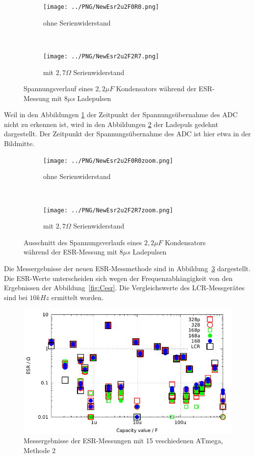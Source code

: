 \begin{figure}[H]
  \begin{subfigure}[b]{9cm}
    \centering
    \texttt{[image: ../PNG/NewEsr2u2F0R0.png]}
    \caption{ohne Serienwiderstand}
  \end{subfigure}
  ~
  \begin{subfigure}[b]{9cm}
    \centering
    \texttt{[image: ../PNG/NewEsr2u2F2R7.png]}
    \caption{mit \(2,7\Omega\) Serienwiderstand}
  \end{subfigure}
  \caption{Spannungsverlauf eines \(2,2\mu F\) Kondensators während der ESR-Messung mit \(8\mu s\) Ladepulsen}
  \label{pic:NewEsr2}
\end{figure}

Weil in den Abbildungen \ref{pic:NewEsr2} der Zeitpunkt der Spannungsübernahme des ADC nicht zu erkennen ist,
wird in den Abbildungen \ref{pic:NewEsr2zoom} der Ladepuls gedehnt dargestellt. Der Zeitpunkt der Spannungsübernahme
des ADC ist hier etwa in der Bildmitte.

\begin{figure}[H]
  \begin{subfigure}[b]{9cm}
    \centering
    \texttt{[image: ../PNG/NewEsr2u2F0R0zoom.png]}
    \caption{ohne Serienwiderstand}
  \end{subfigure}
  ~
  \begin{subfigure}[b]{9cm}
    \centering
    \texttt{[image: ../PNG/NewEsr2u2F2R7zoom.png]}
    \caption{mit \(2,7\Omega\) Serienwiderstand}
  \end{subfigure}
  \caption{Ausschnitt des Spannungsverlaufs eines \(2,2\mu F\) Kondensators während der ESR-Messung mit \(8\mu s\) Ladepulsen}
  \label{pic:NewEsr2zoom}
\end{figure}
 

Die Messergebnisse der neuen ESR-Messmethode sind in Abbildung~\ref{fig:Cesr2} dargestellt.
Die ESR-Werte unterscheiden sich wegen der Frequenzabhängigkeit von den Ergebnissen der Abbildung~\ref{fig:Cesr}.
Die Vergleichswerte des LCR-Messgerätes sind bei \(10kHz\) ermittelt worden.

\begin{figure}[H]
\centering
 \includegraphics[width=16cm]{../GNU/Cesr2.pdf}
\caption{Messergebnisse der ESR-Messungen mit 15 veschiedenen ATmega, Methode 2}
\label{fig:Cesr2}
\end{figure}

